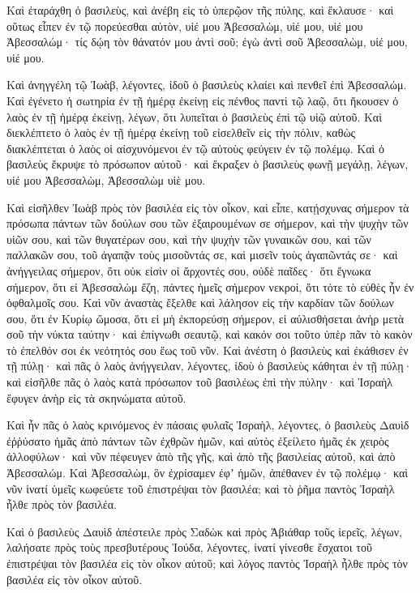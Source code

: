 {Καὶ ἐταράχθη ὁ βασιλεὺς, καὶ ἀνέβη εἰς τὸ ὑπερῷον τῆς πύλης, καὶ ἔκλαυσε· καὶ οὕτως εἶπεν ἐν τῷ πορεύεσθαι αὐτὸν, υἱέ μου Ἀβεσσαλὼμ, υἱέ μου, υἱέ μου Ἀβεσσαλώμ· τίς δῴη τὸν θάνατόν μου ἀντὶ σοῦ; ἐγὼ ἀντὶ σοῦ Ἀβεσσαλὼμ, υἱέ μου, υἱέ μου.
\par }{\PP {}Καὶ ἀνηγγέλη τῷ Ἰωὰβ, λέγοντες, ἰδοῦ ὁ βασιλεὺς κλαίει καὶ πενθεῖ ἐπὶ Ἀβεσσαλώμ.
Καὶ ἐγένετο ἡ σωτηρία ἐν τῇ ἡμέρᾳ ἐκείνῃ εἰς πένθος παντὶ τῷ λαῷ, ὅτι ἤκουσεν ὁ λαὸς ἐν τῇ ἡμέρᾳ ἐκείνῃ, λέγων, ὅτι λυπεῖται ὁ βασιλεὺς ἐπὶ τῷ υἱῷ αὐτοῦ.
Καὶ διεκλέπτετο ὁ λαὸς ἐν τῇ ἡμέρᾳ ἐκείνῃ τοῦ εἰσελθεῖν εἰς τὴν πόλιν, καθὼς διακλέπτεται ὁ λαὸς οἱ αἰσχυνόμενοι ἐν τῷ αὐτοὺς φεύγειν ἐν τῷ πολέμῳ.
Καὶ ὁ βασιλεὺς ἔκρυψε τὸ πρόσωπον αὐτοῦ· καὶ ἔκραξεν ὁ βασιλεὺς φωνῇ μεγάλῃ, λέγων, υἱέ μου Ἀβεσσαλὼμ, Ἀβεσσαλὼμ υἱὲ μου.
\par }{\PP {}Καὶ εἰσῆλθεν Ἰωὰβ πρὸς τὸν βασιλέα εἰς τὸν οἶκον, καὶ εἶπε, κατῄσχυνας σήμερον τὰ πρόσωπα πάντων τῶν δούλων σου τῶν ἐξαιρουμένων σε σήμερον, καὶ τὴν ψυχὴν τῶν υἱῶν σου, καὶ τῶν θυγατέρων σου, καὶ τὴν ψυχὴν τῶν γυναικῶν σου, καὶ τῶν παλλακῶν σου,
τοῦ ἀγαπᾷν τοὺς μισοῦντάς σε, καὶ μισεῖν τοὺς ἀγαπῶντάς σε· καὶ ἀνήγγειλας σήμερον, ὅτι οὐκ εἰσὶν οἱ ἄρχοντές σου, οὐδὲ παῖδες· ὅτι ἔγνωκα σήμερον, ὅτι εἰ Ἀβεσσαλὼμ ἔζη, πάντες ἡμεῖς σήμερον νεκροί, ὅτι τότε τὸ εὐθὲς ἦν ἐν ὀφθαλμοῖς σου.
Καὶ νῦν ἀναστὰς ἔξελθε καὶ λάλησον εἰς τὴν καρδίαν τῶν δούλων σου, ὅτι ἐν Κυρίῳ ὤμοσα, ὅτι εἰ μὴ ἐκπορεύσῃ σήμερον, εἰ αὐλισθήσεται ἀνὴρ μετὰ σοῦ τὴν νύκτα ταύτην· καὶ ἐπίγνωθι σεαυτῷ, καὶ κακόν σοι τοῦτο ὑπὲρ πᾶν τὸ κακὸν τὸ ἐπελθόν σοι ἐκ νεότητός σου ἕως τοῦ νῦν.
Καὶ ἀνέστη ὁ βασιλεὺς καὶ ἐκάθισεν ἐν τῇ πύλῃ· καὶ πᾶς ὁ λαὸς ἀνήγγειλαν, λέγοντες, ἰδοὺ ὁ βασιλεὺς κάθηται ἐν τῇ πύλῃ· καὶ εἰσῆλθε πᾶς ὁ λαὸς κατὰ πρόσωπον τοῦ βασιλέως ἐπὶ τὴν πύλην· καὶ Ἰσραὴλ ἔφυγεν ἀνὴρ εἰς τὰ σκηνώματα αὐτοῦ.
\par }{\PP {}Καὶ ἦν πᾶς ὁ λαὸς κρινόμενος ἐν πάσαις φυλαῖς Ἰσραὴλ, λέγοντες, ὁ βασιλεὺς Δαυὶδ ἐῤῥύσατο ἡμᾶς ἀπὸ πάντων τῶν ἐχθρῶν ἡμῶν, καὶ αὐτὸς ἐξείλετο ἡμᾶς ἐκ χειρὸς ἀλλοφύλων· καὶ νῦν πέφευγεν ἀπὸ τῆς γῆς, καὶ ἀπὸ τῆς βασιλείας αὐτοῦ, καὶ ἀπὸ Ἀβεσσαλώμ.
Καὶ Ἀβεσσαλὼμ, ὃν ἐχρίσαμεν ἐφʼ ἡμῶν, ἀπέθανεν ἐν τῷ πολέμῳ· καὶ νῦν ἱνατί ὑμεῖς κωφεύετε τοῦ ἐπιστρέψαι τὸν βασιλέα; καὶ τὸ ῥῆμα παντὸς Ἰσραὴλ ἦλθε πρὸς τὸν βασιλέα.
\par }{\PP {}Καὶ ὁ βασιλεὺς Δαυὶδ ἀπέστειλε πρὸς Σαδὼκ καὶ πρὸς Ἀβιάθαρ τοῦς ἱερεῖς, λέγων, λαλήσατε πρὸς τοὺς πρεσβυτέρους Ἰούδα, λέγοντες, ἱνατί γίνεσθε ἔσχατοι τοῦ ἐπιστρέψαι τὸν βασιλέα εἰς τὸν οἶκον αὐτοῦ; καὶ λόγος παντὸς Ἰσραὴλ ἦλθε πρὸς τὸν βασιλέα εἰς τὸν οἶκον αὐτοῦ.
}
